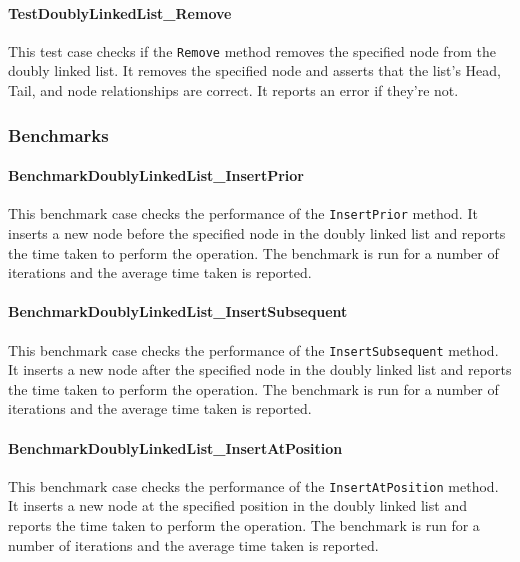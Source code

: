 \paragraph{TestDoublyLinkedList\_Remove}
This test case checks if the \lstinline{Remove} method removes the specified node from the doubly linked list. It removes the specified node and asserts that the list's Head, Tail, and node relationships are correct. It reports an error if they're not.

\subsubsection*{Benchmarks}
\paragraph{BenchmarkDoublyLinkedList\_InsertPrior}
This benchmark case checks the performance of the \lstinline{InsertPrior} method. It inserts a new node before the specified node in the doubly linked list and reports the time taken to perform the operation. The benchmark is run for a number of iterations and the average time taken is reported.

\paragraph{BenchmarkDoublyLinkedList\_InsertSubsequent}
This benchmark case checks the performance of the \lstinline{InsertSubsequent} method. It inserts a new node after the specified node in the doubly linked list and reports the time taken to perform the operation. The benchmark is run for a number of iterations and the average time taken is reported.

\paragraph{BenchmarkDoublyLinkedList\_InsertAtPosition}
This benchmark case checks the performance of the \lstinline{InsertAtPosition} method. It inserts a new node at the specified position in the doubly linked list and reports the time taken to perform the operation. The benchmark is run for a number of iterations and the average time taken is reported.

